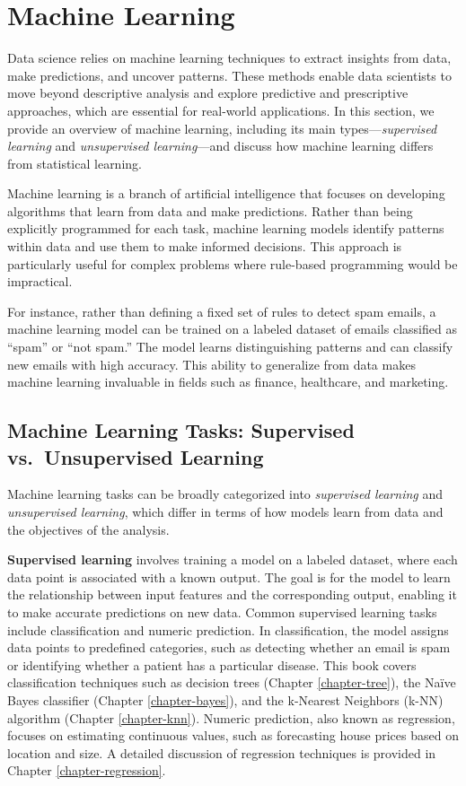 \documentclass[
  11pt,
]{book}
\theoremstyle{definition}
\theoremstyle{definition}
\theoremstyle{definition}
\theoremstyle{definition}
\theoremstyle{remark}
\begin{document}
\section{Machine Learning}\label{machine-learning}

Data science relies on machine learning techniques to extract insights from data, make predictions, and uncover patterns. These methods enable data scientists to move beyond descriptive analysis and explore predictive and prescriptive approaches, which are essential for real-world applications. In this section, we provide an overview of machine learning, including its main types---\emph{supervised learning} and \emph{unsupervised learning}---and discuss how machine learning differs from statistical learning.

Machine learning is a branch of artificial intelligence that focuses on developing algorithms that learn from data and make predictions. Rather than being explicitly programmed for each task, machine learning models identify patterns within data and use them to make informed decisions. This approach is particularly useful for complex problems where rule-based programming would be impractical.

For instance, rather than defining a fixed set of rules to detect spam emails, a machine learning model can be trained on a labeled dataset of emails classified as ``spam'' or ``not spam.'' The model learns distinguishing patterns and can classify new emails with high accuracy. This ability to generalize from data makes machine learning invaluable in fields such as finance, healthcare, and marketing.

\subsection*{Machine Learning Tasks: Supervised vs.~Unsupervised Learning}\label{machine-learning-tasks-supervised-vs.-unsupervised-learning}


Machine learning tasks can be broadly categorized into \emph{supervised learning} and \emph{unsupervised learning}, which differ in terms of how models learn from data and the objectives of the analysis.

\textbf{Supervised learning} involves training a model on a labeled dataset, where each data point is associated with a known output. The goal is for the model to learn the relationship between input features and the corresponding output, enabling it to make accurate predictions on new data. Common supervised learning tasks include classification and numeric prediction. In classification, the model assigns data points to predefined categories, such as detecting whether an email is spam or identifying whether a patient has a particular disease. This book covers classification techniques such as decision trees (Chapter \ref{chapter-tree}), the Naïve Bayes classifier (Chapter \ref{chapter-bayes}), and the k-Nearest Neighbors (k-NN) algorithm (Chapter \ref{chapter-knn}). Numeric prediction, also known as regression, focuses on estimating continuous values, such as forecasting house prices based on location and size. A detailed discussion of regression techniques is provided in Chapter \ref{chapter-regression}.
\end{document}
